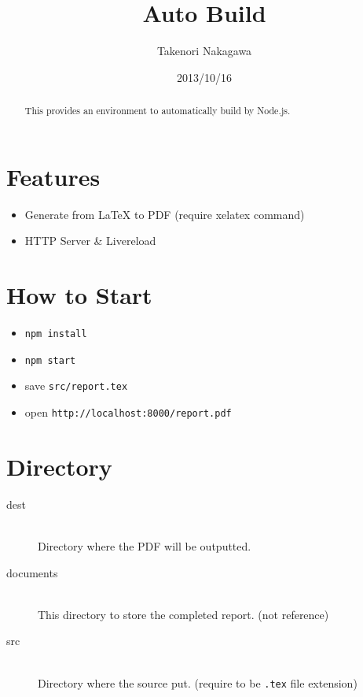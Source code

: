 \documentclass[a4paper]{article}
\title{\XeLaTeX Auto Build}
\author{Takenori Nakagawa}
\date{2013/10/16}
\begin{document}
\maketitle

\begin{abstract}
\center
This provides an environment to automatically build \XeLaTeX by Node.js.
\end{abstract}

\section{Features}
\begin{itemize}
  \item Generate from LaTeX to PDF (require xelatex command)
  \item HTTP Server \& Livereload
\end{itemize}

\section{How to Start}
\begin{itemize}
  \item {\tt npm install}
  \item {\tt npm start}
  \item save {\tt src/report.tex}
  \item open {\tt http://localhost:8000/report.pdf}
\end{itemize}

\section{Directory}
\begin{description}
  \item[dest]\mbox{}\\
  Directory where the PDF will be outputted.

  \item[documents]\mbox{}\\
  This directory to store the completed report. (not reference)

  \item[src]\mbox{}\\
  Directory where the \XeLaTeX source put. (require to be {\tt .tex} file extension)
\end{description}
\end{document}
